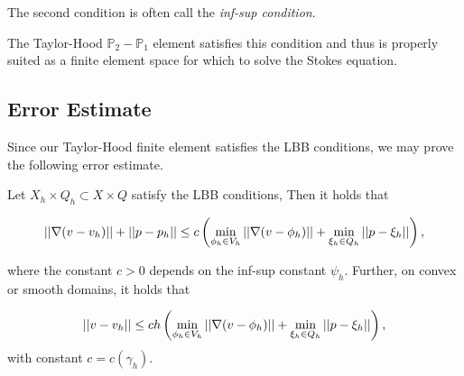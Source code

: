 \documentclass[12pt]{article}
\begin{document}
    The second condition is often call the \textit{inf-sup condition}.

    The Taylor-Hood $\mathbb{P}_2 - \mathbb{P}_1$ element satisfies this condition
    and thus is properly suited as a finite element space for which to solve the
    Stokes equation.

    \subsection{Error Estimate}
    Since our Taylor-Hood finite element satisfies the LBB conditions, we may
    prove the following error estimate.

    \begin{thm}
        Let $X_h \times Q_h \subset X \times Q$ satisfy the LBB conditions,
        Then it holds that

        \begin{equation}
            \left|\left|\nabla(v - v_h)\right|\right| + \left|\left|p - p_h\right|\right| \leq c \left( \min_{\phi_h \in
            V_h} \left|\left|\nabla(v - \phi_h)\right|\right| + \min_{\xi_h \in Q_h} \left|\left|p -
            \xi_h\right|\right|\right),
        \end{equation}

        where the constant $c > 0$ depends on the inf-sup constant $\psi_h$.
        Further, on convex or smooth domains, it holds that

        \begin{equation}
            \left|\left|v - v_h\right|\right| \leq c h \left( \min_{\phi_h \in V_h} \left|\left|\nabla(v -
            \phi_h)\right|\right| + \min_{\xi_h \in Q_h}\left|\left|p - \xi_h\right|\right|\right),
        \end{equation}
        with constant $c = c(\gamma_h)$.
    \end{thm}
\end{document}
